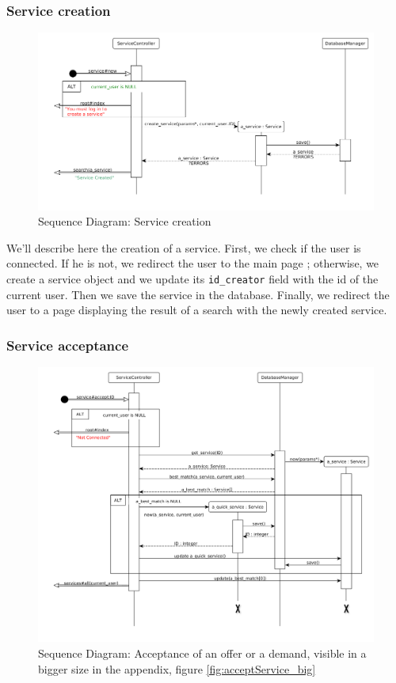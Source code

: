 \subsubsection{Service creation}

\begin{figure}[H]
	\begin{center}
		\includegraphics[width=.75\textwidth]{service_new.png} %
		\caption{Sequence Diagram: Service creation}
		\label{fig:newservice}
	\end{center}
\end{figure}

We'll describe here the creation of a service. First, we check if the user is connected. If he is not, we redirect the user to the main page ; otherwise, we create a service object and we update its \texttt{id\_creator} field with 
the id of the current user. Then we save the service in the database. Finally, we redirect the user to a page displaying the result of a search with the newly created service.


\subsubsection{Service acceptance}
\begin{figure}[H]
	\begin{center}
		\includegraphics[width=.70\textwidth]{service_accepted.png} %
		\caption{Sequence Diagram: Acceptance of an offer or a demand, visible in a bigger size in the appendix, figure \vref{fig:acceptService_big}}
		\label{fig:acceptService}
	\end{center}
\end{figure}

